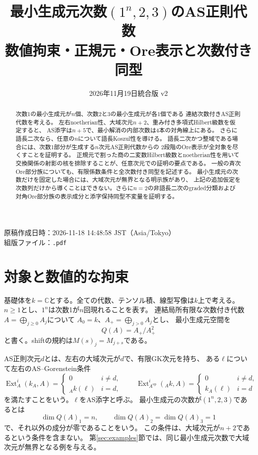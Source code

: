 \documentclass[11pt,a4paper]{ltjsarticle}
\title{最小生成元次数$(1^n,2,3)$のAS正則代数\\
\large 数値拘束・正規元・Ore表示と次数付き同型}
\author{}
\date{2026年11月19日\quad 統合版 v2}
\theoremstyle{definition}
\newcommand{\Ext}{\operatorname{Ext}}
\begin{document}
\hypersetup{pageanchor=false}
\begin{titlepage}
\maketitle
\thispagestyle{empty}
\begin{abstract}
次数1の最小生成元が$n$個、次数2と3の最小生成元が各1個である
連結次数付きAS正則代数を考える。
左右noetherian性、大域次元$n+2$、重み付き多項式Hilbert級数を仮定すると、
AS添字は$n+5$で、最小解消の内部次数は4本の対角線上にある。
さらに語長二次なら、任意の$n$について語長Koszul性を導ける。
語長二次かつ整域である場合には、次数1部分が生成する$n$次元AS正則代数からの
2段階のOre表示が全対象を尽くすことを証明する。
正規元で割った商の二変数Hilbert級数とnoetherian性を用いて
交換関係の射影の核を排除することが、任意次元での証明の要点である。
一般の斉次Ore部分族についても、有限係数条件と全次数付き同型を記述する。
最小生成元の次数だけを固定した場合には、大域次元が無界となる明示族があり、
上記の追加仮定を次数列だけから導くことはできない。さらに$n=2$の非語長二次のgraded分類および対角Ore部分族の表示成分と添字保持同型不変量を証明する。
\end{abstract}
\vfill
\begin{center}
原稿作成日時：2026-11-18 14:48:58 JST（Asia/Tokyo）\\
組版ファイル：\texttt{\jobname.pdf}
\end{center}
\end{titlepage}
\hypersetup{pageanchor=true}
\tableofcontents
\clearpage
{}

\section{対象と数値的な拘束}\label{sec:scope-numerical}
基礎体を$k=\mathbb C$とする。全ての代数、テンソル積、線型写像は$k$上で考える。
$n\geq1$とし、$1^n$は次数1が$n$回現れることを表す。
連結局所有限な次数付き代数$A=\bigoplus_{j\geq0}A_j$について
$A_0=k$、$A_+=\bigoplus_{j>0}A_j$とし、
最小生成元空間を
\[
Q(A)=A_+/A_+^2
\]
と書く。shiftの規約は$M(s)_j=M_{j+s}$である。

AS正則次元$d$とは、左右の大域次元が$d$で、有限GK次元を持ち、
ある$\ell$について左右のAS--Gorenstein条件
\[
\Ext_A^i(k_A,A)=
\begin{cases}0&i\ne d,\\ {}_Ak(\ell)&i=d,\end{cases}
\qquad
\Ext_{A^{\mathrm{op}}}^i({}_Ak,A)=
\begin{cases}0&i\ne d,\\ k_A(\ell)&i=d\end{cases}
\]
を満たすことをいう。$\ell$をAS添字と呼ぶ。
最小生成元の次数が$(1^n,2,3)$であるとは
\[
\dim Q(A)_1=n,\qquad \dim Q(A)_2=\dim Q(A)_3=1
\]
で、それ以外の成分が零であることをいう。
この条件は、大域次元が$n+2$であるという条件を含まない。
第\ref{sec:examples}節では、同じ最小生成元次数で大域次元が無界となる例を与える。
\end{document}
